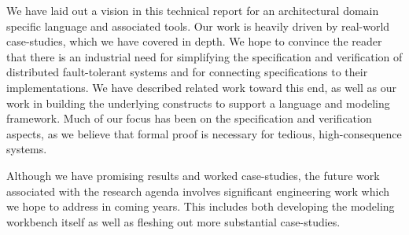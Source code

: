 We have laid out a vision in this technical report for an architectural domain
specific language and associated tools. Our work is heavily driven by
real-world case-studies, which we have covered in depth. We hope to convince
the reader that there is an industrial need for simplifying the specification
and verification of distributed fault-tolerant systems and for connecting
specifications to their implementations. We have described related work toward
this end, as well as our work in building the underlying constructs to support
a language and modeling framework. Much of our focus has been on the
specification and verification aspects, as we believe that formal proof is
necessary for tedious, high-consequence systems.

Although we have promising results and worked case-studies, the future work
associated with the research agenda involves significant engineering
work which we hope to address in coming years. This includes both developing the
modeling workbench itself as well as fleshing out more substantial case-studies.
